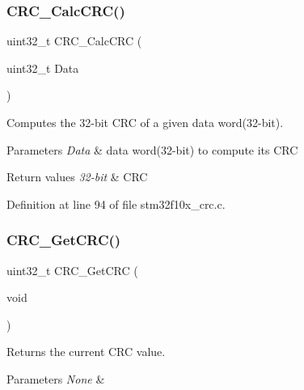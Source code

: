 \subsubsection{\texorpdfstring{C\+R\+C\+\_\+\+Calc\+C\+R\+C()}{CRC\_CalcCRC()}}
{\footnotesize\ttfamily uint32\+\_\+t C\+R\+C\+\_\+\+Calc\+C\+RC (\begin{DoxyParamCaption}\item[{uint32\+\_\+t}]{Data }\end{DoxyParamCaption})}



Computes the 32-\/bit C\+RC of a given data word(32-\/bit). 


\begin{DoxyParams}{Parameters}
{\em Data} & data word(32-\/bit) to compute its C\+RC \\
\hline
\end{DoxyParams}

\begin{DoxyRetVals}{Return values}
{\em 32-\/bit} & C\+RC \\
\hline
\end{DoxyRetVals}


Definition at line 94 of file stm32f10x\+\_\+crc.\+c.

\mbox{\label{group___c_r_c___private___functions_gab62db4561b0558f3c8ed53887fe7de8b}} 
\subsubsection{\texorpdfstring{C\+R\+C\+\_\+\+Get\+C\+R\+C()}{CRC\_GetCRC()}}
{\footnotesize\ttfamily uint32\+\_\+t C\+R\+C\+\_\+\+Get\+C\+RC (\begin{DoxyParamCaption}\item[{void}]{ }\end{DoxyParamCaption})}



Returns the current C\+RC value. 


\begin{DoxyParams}{Parameters}
{\em None} & \\
\hline
\end{DoxyParams}

